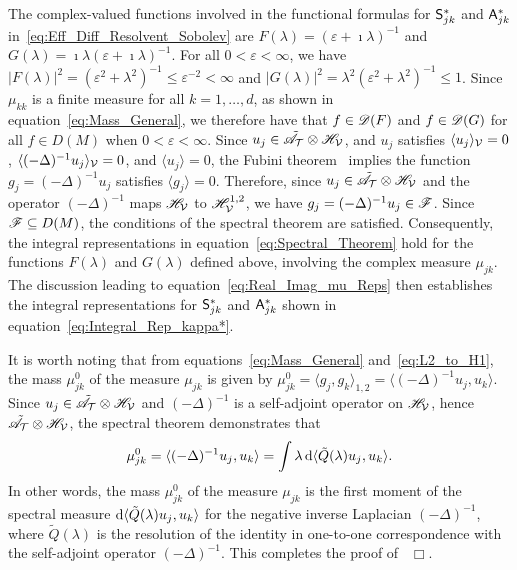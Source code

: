 \documentclass[amsa]{ipart}
\begin{document}
The
complex-valued functions involved in the functional formulas for
$\mathsf{S}^*_{jk}$ and $\mathsf{A}^*_{jk}$ in~\eqref{eq:Eff_Diff_Resolvent_Sobolev}
are $F(\lambda)=(\varepsilon+\imath\lambda)^{-1}$ and $G(\lambda)=\imath\lambda(\varepsilon+\imath\lambda)^{-1}$. For all $0<\varepsilon<\infty$, 
we have $|F(\lambda)|^2=(\varepsilon^2+\lambda^2)^{-1}\leq\varepsilon^{-2}<\infty$ and 
$|G(\lambda)|^2=\lambda^2(\varepsilon^2+\lambda^2)^{-1}\leq 1$. Since $\mu_{kk}$ is a finite measure
for all $k=1,\ldots,d$, as shown in equation~\eqref{eq:Mass_General}, we
therefore have 
that $f\in\mathscr{D}(F)$ and $f\in\mathscr{D}(G)$ for all $f\in D(M)$ when $0<\varepsilon<\infty$. 
Since $u_j\in\tilde{\mathscr{A}}_{\mathcal{T}}\otimes\mathscr{H}_{\mathcal{V}}$, and $u_j$ satisfies $\langle u_j\rangle_{\mathcal{V}}=0$,
$\langle(-\Delta)^{-1}u_j\rangle_{\mathcal{V}}=0$, and $\langle u_j\rangle=0$, the Fubini
theorem~\cite{Folland:99:RealAnalysis} implies the function
$g_j=(-\Delta)^{-1}u_j$ satisfies $\langle g_j\rangle=0$. Therefore, since 
$u_j\in\tilde{\mathscr{A}}_{\mathcal{T}}\otimes\mathscr{H}_{\mathcal{V}}$ and the operator $(-\Delta)^{-1}$ maps
$\mathscr{H}_{\mathcal{V}}$ to $\mathscr{H}^{1,2}_{\mathcal{V}}$, we have $g_j=(-\Delta)^{-1}u_j\in\mathscr{F}$. Since
$\mathscr{F}\subseteq D(M)$, the conditions of the spectral theorem are 
satisfied. Consequently, the integral representations in
equation~\eqref{eq:Spectral_Theorem} hold for the functions $F(\lambda)$ and
$G(\lambda)$ defined above, involving the complex measure $\mu_{jk}$. The
discussion leading to equation~\eqref{eq:Real_Imag_mu_Reps} then
establishes the integral representations for $\mathsf{S}^*_{jk}$ and
$\mathsf{A}^*_{jk}$ shown in equation~\eqref{eq:Integral_Rep_kappa*}.




It is worth noting that from
equations~\eqref{eq:Mass_General} and~\eqref{eq:L2_to_H1}, the mass 
$\mu_{jk}^0$ of the measure $\mu_{jk}$ is given by
$\mu_{jk}^0=\langle g_j,g_k\rangle_{1,2}=\langle(-\Delta)^{-1}u_j,u_k\rangle$. Since
$u_j\in\tilde{\mathscr{A}}_{\mathcal{T}}\otimes\mathscr{H}_{\mathcal{V}}$ and $(-\Delta)^{-1}$ is a
self-adjoint operator on $\mathscr{H}_{\mathcal{V}}$, hence
$\tilde{\mathscr{A}}_{\mathcal{T}}\otimes\mathscr{H}_{\mathcal{V}}$, the spectral theorem demonstrates
that    
%
\begin{align}\label{eq:Laplacian_moment}
  \mu_{jk}^0=\langle(-\Delta)^{-1}u_j,u_k\rangle=\int\lambda\,\d\langle\tilde{Q}(\lambda)u_j,u_k\rangle.
\end{align}
%
In other words, the mass $\mu_{jk}^0$ of the measure $\mu_{jk}$ is the
first moment of the spectral measure $\mathrm{d}\langle\tilde{Q}(\lambda)u_j,u_k\rangle$ for 
the negative inverse Laplacian $(-\Delta)^{-1}$, where $\tilde{Q}(\lambda)$ is
the resolution of the identity in one-to-one correspondence with the 
self-adjoint operator $(-\Delta)^{-1}$. This completes the proof
of~ $\Box$.  
\end{document}

